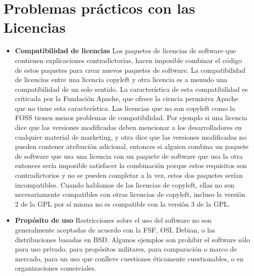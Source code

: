 \section {Problemas prácticos con las Licencias}
\begin{itemize}
	\item {\bf Compatibilidad de licencias}
Los paquetes de licencias de software que contienen explicaciones contradictorias, hacen imposible combinar el código de estos paquetes para crear nuevos paquetes de software. La compatibilidad de licencias entre una licencia copyleft y otra licencia es a menudo una compatibilidad de un solo sentido. La característica de esta compatibilidad es criticada por la Fundación Apache, que ofrece la ciencia permisiva Apache que no tiene esta característica. Las licencias que no son copyleft como la FOSS tienen menos problemas de compatibilidad. Por ejemplo si una licencia dice que las versiones modificadas deben mencionar a los desarrolladores en cualquier material de marketing, y otra dice que las versiones modificadas no pueden contener atribución adicional, entonces si alguien combina un paquete de software que usa una licencia con un paquete de software que usa la otra entonces sería imposible satisfacer la combinación porque estos requisitos son contradictorios y no se pueden completar a la vez, estos dos paquetes serían incompatibles. Cuando hablamos de las licencias de copyleft, ellas no son necesariamente compatibles con otras licencias de copyleft, incluso la versión 2 de la GPL por sí misma no es compatible con la versión 3 de la GPL.
	\item {\bf Propósito de uso}
Restricciones sobre el uso del software no son generalmente aceptadas de acuerdo con la FSF, OSI, Debian, o las distribuciones basadas en BSD. Algunos ejemplos son prohibir el software sólo para uso privado, para propósitos militares, para comparación o marco de mercado, para un uso que conlleve cuestiones éticamente cuestionables, o en organizaciones comerciales.
\end{itemize}

